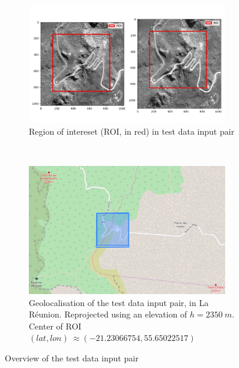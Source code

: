 \documentclass[paper=a4, fontsize=11pt, onecolumn, tikz, dvipsnames, svgnames, x11names]{article}
\begin{document}
\begin{figure}[H]
    \centering
    \begin{subfigure}[t]{0.8\textwidth}
        \centering
        \includegraphics[width = 0.95\textwidth]{ROI_testdata_pair.jpeg}
        \caption{Region of intereset (ROI, in red) in test data input pair}
    \end{subfigure}%
    ~
    \vfill
    ~
    \begin{subfigure}[t]{0.8\textwidth}
        \centering
        \includegraphics[width = 0.95\textwidth]{geoloc_testdata.png}
        \caption{Geolocalisation of the test data input pair, in La Réunion. Reprojected using an elevation of $h=2350~m$. Center of ROI $(lat, lon) ~\approx (-21.23066754, 55.65022517)$}
    \end{subfigure}%
    \caption{Overview of the test data input pair}
    \label{fig_geoloc_testdata}
\end{figure}
\end{document}
